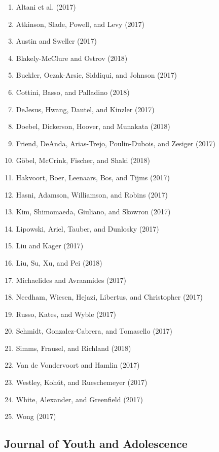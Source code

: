 \documentclass[english,man]{apa6}
\providecommand{\tightlist}{%
  \setlength{\itemsep}{0pt}\setlength{\parskip}{0pt}}
\theoremstyle{definition}
\theoremstyle{definition}
\theoremstyle{definition}
\theoremstyle{remark}
\begin{document}
\begin{enumerate}
\def\labelenumi{\arabic{enumi})}
\tightlist
\item
  Altani et al. (2017)
\item
  Atkinson, Slade, Powell, and Levy (2017)
\item
  Austin and Sweller (2017)
\item
  Blakely-McClure and Ostrov (2018)
\item
  Buckler, Oczak-Arsic, Siddiqui, and Johnson (2017)
\item
  Cottini, Basso, and Palladino (2018)
\item
  DeJesus, Hwang, Dautel, and Kinzler (2017)
\item
  Doebel, Dickerson, Hoover, and Munakata (2018)
\item
  Friend, DeAnda, Arias-Trejo, Poulin-Dubois, and Zesiger (2017)
\item
  Göbel, McCrink, Fischer, and Shaki (2018)
\item
  Hakvoort, Boer, Leenaars, Bos, and Tijms (2017)
\item
  Hasni, Adamson, Williamson, and Robins (2017)
\item
  Kim, Shimomaeda, Giuliano, and Skowron (2017)
\item
  Lipowski, Ariel, Tauber, and Dunlosky (2017)
\item
  Liu and Kager (2017)
\item
  Liu, Su, Xu, and Pei (2018)
\item
  Michaelides and Avraamides (2017)
\item
  Needham, Wiesen, Hejazi, Libertus, and Christopher (2017)
\item
  Russo, Kates, and Wyble (2017)
\item
  Schmidt, Gonzalez-Cabrera, and Tomasello (2017)
\item
  Simms, Frausel, and Richland (2018)
\item
  Van de Vondervoort and Hamlin (2017)
\item
  Westley, Kohút, and Rueschemeyer (2017)
\item
  White, Alexander, and Greenfield (2017)
\item
  Wong (2017)
\end{enumerate}

\subsection{Journal of Youth and
Adolescence}\label{journal-of-youth-and-adolescence}
\end{document}
